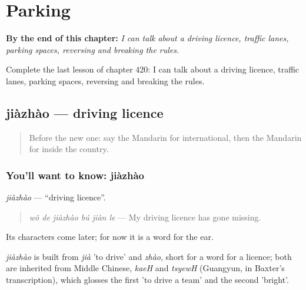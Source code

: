 
\chapter{Parking}
\label{ch:zh-parking}

\begin{chapteropening}
\textbf{By the end of this chapter:} \emph{I can talk about a driving licence, traffic lanes, parking spaces, reversing and breaking the rules.}

Complete the last lesson of chapter 420: I can talk about a driving licence, traffic lanes, parking spaces, reversing and breaking the rules.
\end{chapteropening}

\section[jiàzhào]{jiàzhào — driving licence}

\label{lesson:ZH-C420-jiazhao}



\begin{quote}
Before the new one: say the Mandarin for international, then the Mandarin for inside the country.
\end{quote}

\subsection*{You'll want to know: jiàzhào}
\emph{jiàzhào} — \textquotedblleft{}driving licence\textquotedblright{}.

\begin{quote}
\emph{wǒ de jiàzhào bú jiàn le} — My driving licence has gone missing.
\end{quote}

Its characters come later; for now it is a word for the ear.

\begin{cousinweb}
\emph{jiàzhào} is built from \emph{jià} 'to drive' and \emph{zhào}, short for a word for a licence; both are inherited from Middle Chinese, \emph{kaeH} and \emph{tsyewH} (Guangyun, in Baxter's transcription), which glosses the first 'to drive a team' and the second 'bright'.
\end{cousinweb}

